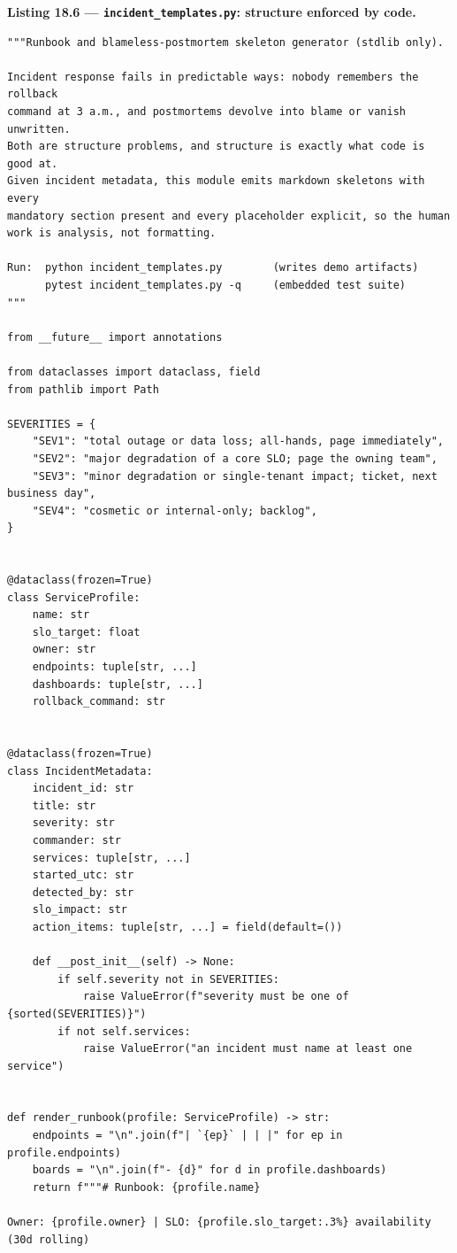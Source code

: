 \noindent\textbf{Listing 18.6 --- \texttt{incident\_templates.py}: structure
enforced by code.}
\label{lst:ch18-templates}
\begin{verbatim}
"""Runbook and blameless-postmortem skeleton generator (stdlib only).

Incident response fails in predictable ways: nobody remembers the rollback
command at 3 a.m., and postmortems devolve into blame or vanish unwritten.
Both are structure problems, and structure is exactly what code is good at.
Given incident metadata, this module emits markdown skeletons with every
mandatory section present and every placeholder explicit, so the human
work is analysis, not formatting.

Run:  python incident_templates.py        (writes demo artifacts)
      pytest incident_templates.py -q     (embedded test suite)
"""

from __future__ import annotations

from dataclasses import dataclass, field
from pathlib import Path

SEVERITIES = {
    "SEV1": "total outage or data loss; all-hands, page immediately",
    "SEV2": "major degradation of a core SLO; page the owning team",
    "SEV3": "minor degradation or single-tenant impact; ticket, next business day",
    "SEV4": "cosmetic or internal-only; backlog",
}


@dataclass(frozen=True)
class ServiceProfile:
    name: str
    slo_target: float
    owner: str
    endpoints: tuple[str, ...]
    dashboards: tuple[str, ...]
    rollback_command: str


@dataclass(frozen=True)
class IncidentMetadata:
    incident_id: str
    title: str
    severity: str
    commander: str
    services: tuple[str, ...]
    started_utc: str
    detected_by: str
    slo_impact: str
    action_items: tuple[str, ...] = field(default=())

    def __post_init__(self) -> None:
        if self.severity not in SEVERITIES:
            raise ValueError(f"severity must be one of {sorted(SEVERITIES)}")
        if not self.services:
            raise ValueError("an incident must name at least one service")


def render_runbook(profile: ServiceProfile) -> str:
    endpoints = "\n".join(f"| `{ep}` | | |" for ep in profile.endpoints)
    boards = "\n".join(f"- {d}" for d in profile.dashboards)
    return f"""# Runbook: {profile.name}

Owner: {profile.owner} | SLO: {profile.slo_target:.3%} availability (30d rolling)


\end{verbatim}
